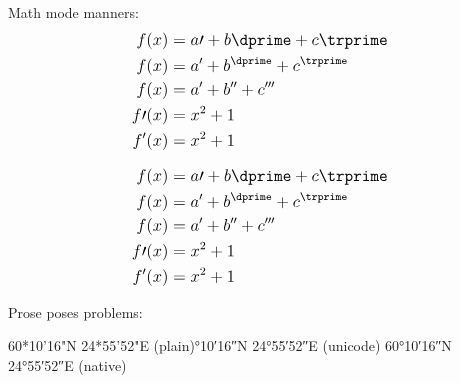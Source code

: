 \documentclass{article}
\begin{document}
\fontsize{12}{16}
\selectfont

Math mode manners:
\[\mathlarger{\begin{aligned}
	f(x) & = a\prime + b\dprime + c\trprime \\
	f(x) & = a^{\prime} + b^{\dprime} + c^{\trprime} \\
	f(x) & = a' + b'' + c''' \\
	f\prime(x) & = x^{2} + 1\\
	f'(x) & = x^{2} + 1
\end{aligned}}\]

\[\mathlarger{\begin{aligned}
	f(x) & = a\prime + b\dprime + c\trprime \\
	f(x) & = a^{\prime} + b^{\dprime} + c^{\trprime} \\
	f(x) & = a' + b'' + c''' \\
	f\prime(x) & = x^{2} + 1\\
	f'(x) & = x^{2} + 1
\end{aligned}}\]

Prose poses problems:
\smallskip

\raggedright{
	60*10'16"N 24*55'52"E (plain)°10′16″N 24°55′52″E (unicode)\break
	\ang{60;10;16}N \ang{24;55;52}E (native)
}
\end{document}
